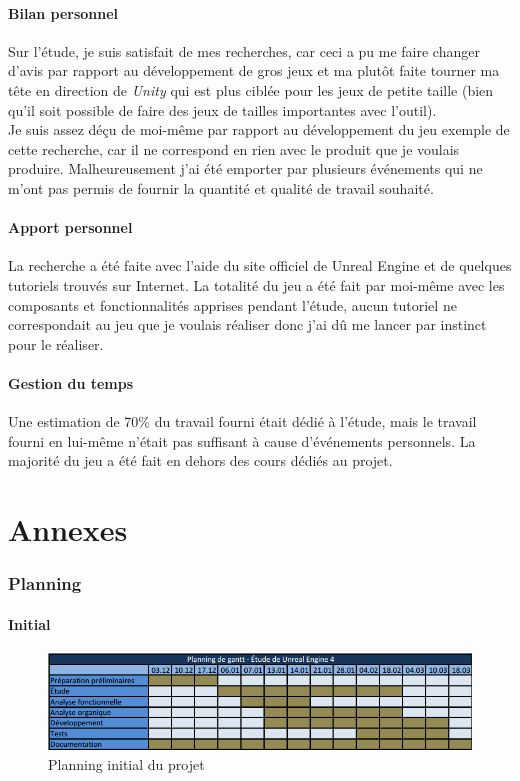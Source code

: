 \documentclass[11pt, a4paper, oneside]{article}
\begin{document}
\subsection{Bilan personnel}
Sur l'étude, je suis satisfait de mes recherches, car ceci a pu me faire changer d'avis par rapport au développement de gros jeux et ma plutôt faite tourner ma tête en direction de \emph{Unity} qui est plus ciblée pour les jeux de petite taille (bien qu'il soit possible de faire des jeux de tailles importantes avec l'outil).\\[0.2cm]
Je suis assez déçu de moi-même par rapport au développement du jeu exemple de cette recherche, car il ne correspond en rien avec le produit que je voulais produire. Malheureusement j'ai été emporter par plusieurs événements qui ne m'ont pas permis de fournir la quantité et qualité de travail souhaité.

\subsection{Apport personnel}
La recherche a été faite avec l'aide du site officiel de Unreal Engine et de quelques tutoriels trouvés sur Internet. La totalité du jeu a été fait par moi-même avec les composants et fonctionnalités apprises pendant l'étude, aucun tutoriel ne correspondait au jeu que je voulais réaliser donc j'ai dû me lancer par instinct pour le réaliser.

\subsection{Gestion du temps}
Une estimation de 70\% du travail fourni était dédié à l'étude, mais le travail fourni en lui-même n'était pas suffisant à cause d'événements personnels. La majorité du jeu a été fait en dehors des cours dédiés au projet.

\newpage
\part{Annexes}
\section{Planning}
\subsection{Initial}
\begin{figure}[h]
	\begin{center}
	\includegraphics[width=\textwidth, angle=90]{planninggantt}
	\caption{Planning initial du projet}
	\label{planningintial}
	\end{center}
\end{figure}
\newpage
\end{document}
